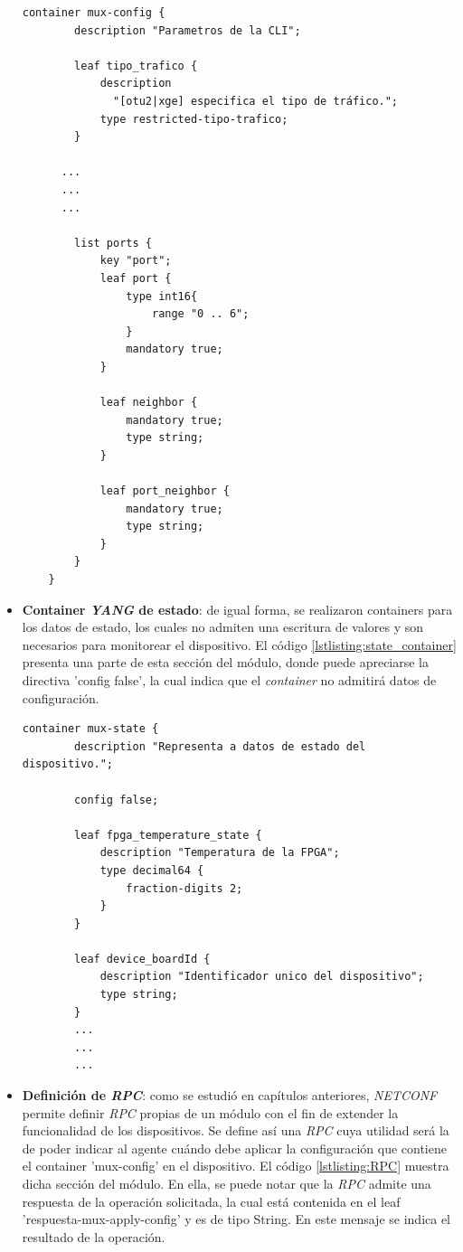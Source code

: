 \begin{itemize}
    \begin{lstlisting}[language=SHELXL, caption=Container de configuración., label=lstlisting:config_container]
    container mux-config {
        description "Parametros de la CLI";

        leaf tipo_trafico {
            description
              "[otu2|xge] especifica el tipo de tráfico.";
            type restricted-tipo-trafico;
        }
      
      ...
      ...
      ...
        
        list ports {
            key "port";
            leaf port {
                type int16{
                    range "0 .. 6";
                }
                mandatory true;
            }

            leaf neighbor {
                mandatory true;
                type string;
            }
            
            leaf port_neighbor {
                mandatory true;
                type string;
            }
        }
    }
    \end{lstlisting}

    \item \textbf{Container \textit{YANG} de estado}: de igual forma, se realizaron containers para los datos de estado, los cuales no admiten una escritura de valores y son necesarios para monitorear el dispositivo. El código \ref{lstlisting:state_container} presenta una parte de esta sección del módulo, donde puede apreciarse la directiva ’config false’, la cual indica que el \textit{container} no admitirá datos de configuración.  

    \begin{lstlisting}[language=SHELXL, caption=Container de estado., label=lstlisting:state_container]
    container mux-state {
        description "Representa a datos de estado del dispositivo.";
        
        config false;

        leaf fpga_temperature_state {
            description "Temperatura de la FPGA";
            type decimal64 {
                fraction-digits 2;
            }
        }
   
        leaf device_boardId {
            description "Identificador unico del dispositivo";
            type string;
        }
        ...
        ...
        ...
    \end{lstlisting}


    \item \textbf{Definición de \textit{RPC}}: como se estudió en capítulos anteriores, \textit{NETCONF} permite definir \textit{RPC} propias de un módulo con el fin de extender la funcionalidad de los dispositivos. Se define así una \textit{RPC} cuya utilidad será la de poder indicar al agente cuándo debe aplicar la configuración que contiene el container 'mux-config' en el dispositivo. El código \ref{lstlisting:RPC} muestra dicha sección del módulo. En ella, se puede notar que la \textit{RPC} admite una respuesta de la operación solicitada, la cual está contenida en el leaf 'respuesta-mux-apply-config' y es de tipo String. En este mensaje se indica el resultado de la operación.


\end{itemize}
